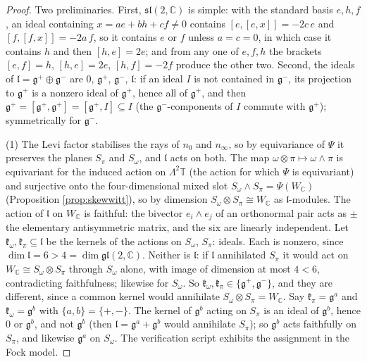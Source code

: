 \documentclass[11pt]{article}
\theoremstyle{definition}
\newcommand{\C}{\mathbb{C}}
\newcommand{\T}{\mathbb{T}}
\newcommand{\nO}{n_0}
\newcommand{\nInf}{n_\infty}
\newcommand{\Som}{S_\omega}
\newcommand{\Spi}{S_\pi}
\begin{document}
\begin{proof}
Two preliminaries. First, $\mathfrak{sl}(2,\C)$ is simple: with the standard basis $e, h, f$, an ideal containing $x = ae + bh + cf \neq 0$ contains $[e,[e,x]] = -2c\,e$ and $[f,[f,x]] = -2a\,f$, so it contains $e$ or $f$ unless $a = c = 0$, in which case it contains $h$ and then $[h,e] = 2e$; and from any one of $e, f, h$ the brackets $[e,f] = h$, $[h,e] = 2e$, $[h,f] = -2f$ produce the other two. Second, the ideals of $\mathfrak{l} = \mathfrak{g}^+\oplus\mathfrak{g}^-$ are $0$, $\mathfrak{g}^+$, $\mathfrak{g}^-$, $\mathfrak{l}$: if an ideal $I$ is not contained in $\mathfrak{g}^-$, its projection to $\mathfrak{g}^+$ is a nonzero ideal of $\mathfrak{g}^+$, hence all of $\mathfrak{g}^+$, and then $\mathfrak{g}^+ = [\mathfrak{g}^+, \mathfrak{g}^+] = [\mathfrak{g}^+, I] \subseteq I$ (the $\mathfrak{g}^-$-components of $I$ commute with $\mathfrak{g}^+$); symmetrically for $\mathfrak{g}^-$.

(1) The Levi factor stabilises the rays of $\nO$ and $\nInf$, so by equivariance of $\Psi$ it preserves the planes $\Spi$ and $\Som$, and $\mathfrak{l}$ acts on both. The map $\omega\otimes\pi \mapsto \omega\wedge\pi$ is equivariant for the induced action on $\Lambda^2\T$ (the action for which $\Psi$ is equivariant) and surjective onto the four-dimensional mixed slot $\Som\wedge\Spi = \Psi(W_\C)$ (Proposition \ref{prop:skewwitt}), so by dimension $\Som\otimes\Spi \cong W_\C$ as $\mathfrak{l}$-modules. The action of $\mathfrak{l}$ on $W_\C$ is faithful: the bivector $e_i\wedge e_j$ of an orthonormal pair acts as $\pm$ the elementary antisymmetric matrix, and the six are linearly independent. Let $\mathfrak{k}_\omega, \mathfrak{k}_\pi \subseteq \mathfrak{l}$ be the kernels of the actions on $\Som$, $\Spi$: ideals. Each is nonzero, since $\dim\mathfrak{l} = 6 > 4 = \dim\mathfrak{gl}(2,\C)$. Neither is $\mathfrak{l}$: if $\mathfrak{l}$ annihilated $\Spi$ it would act on $W_\C \cong \Som\otimes\Spi$ through $\Som$ alone, with image of dimension at most $4 < 6$, contradicting faithfulness; likewise for $\Som$. So $\mathfrak{k}_\omega, \mathfrak{k}_\pi \in \{\mathfrak{g}^+, \mathfrak{g}^-\}$, and they are different, since a common kernel would annihilate $\Som\otimes\Spi = W_\C$. Say $\mathfrak{k}_\pi = \mathfrak{g}^a$ and $\mathfrak{k}_\omega = \mathfrak{g}^b$ with $\{a, b\} = \{+,-\}$. The kernel of $\mathfrak{g}^b$ acting on $\Spi$ is an ideal of $\mathfrak{g}^b$, hence $0$ or $\mathfrak{g}^b$, and not $\mathfrak{g}^b$ (then $\mathfrak{l} = \mathfrak{g}^a + \mathfrak{g}^b$ would annihilate $\Spi$); so $\mathfrak{g}^b$ acts faithfully on $\Spi$, and likewise $\mathfrak{g}^a$ on $\Som$. The verification script exhibits the assignment in the Fock model.


\end{proof}
\end{document}
